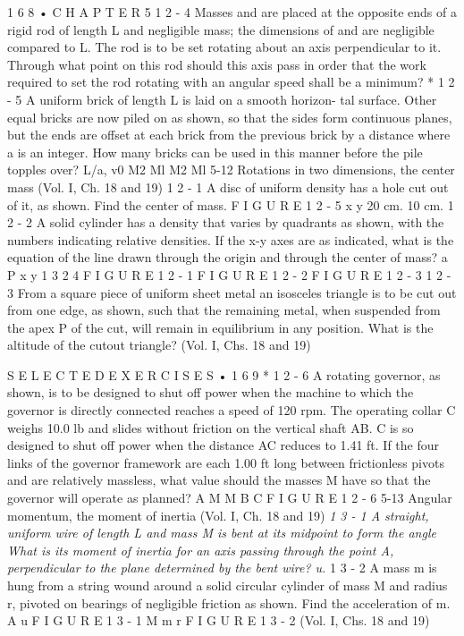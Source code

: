 \documentclass[10pt,oneside]{article}
\begin{document}
1 6 8 • C H A P T E R  5 \emph{ } 1 2 - 4 Masses and are placed at the opposite ends of a rigid rod of length L and negligible mass; the dimensions of and are negligible compared to L. The rod is to be set rotating about an axis perpendicular to it. Through what point on this rod should this axis pass in order that the work required to set the rod rotating with an angular speed shall be a minimum? \emph{ } * 1 2 - 5 A uniform brick of length L is laid on a smooth horizon- tal surface. Other equal bricks are now piled on as shown, so that the sides form continuous planes, but the ends are offset at each brick from the previous brick by a distance where a is an integer. How many bricks can be used in this manner before the pile topples over? L/a, v0 M2 Ml M2 Ml 5-12 Rotations in two dimensions, the center mass (Vol. I, Ch. 18 and 19) \emph{ } 1 2 - 1 A disc of uniform density has a hole cut out of it, as shown. Find the center of mass. F I G U R E  1 2 - 5 x y 20 cm. 10 cm. \emph{ } 1 2 - 2 A solid cylinder has a density that varies by quadrants as shown, with the numbers indicating relative densities. If the x-y axes are as indicated, what is the equation of the line drawn through the origin and through the center of mass? a P x y 1 3 2 4 F I G U R E  1 2 - 1 F I G U R E  1 2 - 2 F I G U R E  1 2 - 3 \emph{ } 1 2 - 3 From a square piece of uniform sheet metal an isosceles triangle is to be cut out from one edge, as shown, such that the remaining metal, when suspended from the apex P of the cut, will remain in equilibrium in any position. What is the altitude of the cutout triangle? (Vol. I, Chs. 18 and 19)\par

S E L E C T E D  E X E R C I S E S • 1 6 9 \emph{ } * 1 2 - 6 A rotating governor, as shown, is to be designed to shut off power when the machine to which the governor is directly connected reaches a speed of 120 rpm. The operating collar C weighs 10.0 lb and slides without friction on the vertical shaft AB. C is so designed to shut off power when the distance AC reduces to 1.41 ft. If the four links of the governor framework are each 1.00 ft long between frictionless pivots and are relatively massless, what value should the masses M have so that the governor will operate as planned? A M M B C F I G U R E  1 2 - 6 5-13 Angular momentum, the moment of inertia (Vol. I, Ch. 18 and 19) \emph{ 1 3 - 1 A straight, uniform wire of length L and mass M is bent at its midpoint to form the angle What is its moment of inertia for an axis passing through the point A, perpendicular to the plane determined by the bent wire? u. } 1 3 - 2 A mass m is hung from a string wound around a solid circular cylinder of mass M and radius r, pivoted on bearings of negligible friction as shown. Find the acceleration of m. A u F I G U R E  1 3 - 1 M m r F I G U R E  1 3 - 2 (Vol. I, Chs. 18 and 19)\par
\end{document}
